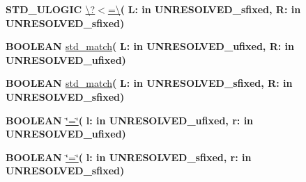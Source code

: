 \begin{DoxyCompactItemize}
\item 
{\bfseries {\bfseries \textcolor{comment}{S\+T\+D\+\_\+\+U\+L\+O\+G\+I\+C}\textcolor{vhdlchar}{ }}} \hyperlink{class__fixed__pkg_a276b77e776712ce9027d7858f46bf7b7}{\textbackslash{}?$<$=\textbackslash{}}{\bfseries  ( }{\bfseries \textcolor{vhdlchar}{L\+: }\textcolor{stringliteral}{in }\textcolor{vhdlchar}{U\+N\+R\+E\+S\+O\+L\+V\+E\+D\+\_\+sfixed}}{\bfseries  , \textcolor{vhdlchar}{R\+: }\textcolor{stringliteral}{in }\textcolor{vhdlchar}{U\+N\+R\+E\+S\+O\+L\+V\+E\+D\+\_\+sfixed}}{\bfseries  )} 
\item 
{\bfseries {\bfseries \textcolor{comment}{B\+O\+O\+L\+E\+A\+N}\textcolor{vhdlchar}{ }}} \hyperlink{class__fixed__pkg_ae375556995afe4742e27b94c60c7b976}{std\+\_\+match}{\bfseries  ( }{\bfseries \textcolor{vhdlchar}{L\+: }\textcolor{stringliteral}{in }\textcolor{vhdlchar}{U\+N\+R\+E\+S\+O\+L\+V\+E\+D\+\_\+ufixed}}{\bfseries  , \textcolor{vhdlchar}{R\+: }\textcolor{stringliteral}{in }\textcolor{vhdlchar}{U\+N\+R\+E\+S\+O\+L\+V\+E\+D\+\_\+ufixed}}{\bfseries  )} 
\item 
{\bfseries {\bfseries \textcolor{comment}{B\+O\+O\+L\+E\+A\+N}\textcolor{vhdlchar}{ }}} \hyperlink{class__fixed__pkg_ae375556995afe4742e27b94c60c7b976}{std\+\_\+match}{\bfseries  ( }{\bfseries \textcolor{vhdlchar}{L\+: }\textcolor{stringliteral}{in }\textcolor{vhdlchar}{U\+N\+R\+E\+S\+O\+L\+V\+E\+D\+\_\+sfixed}}{\bfseries  , \textcolor{vhdlchar}{R\+: }\textcolor{stringliteral}{in }\textcolor{vhdlchar}{U\+N\+R\+E\+S\+O\+L\+V\+E\+D\+\_\+sfixed}}{\bfseries  )} 
\item 
{\bfseries {\bfseries \textcolor{comment}{B\+O\+O\+L\+E\+A\+N}\textcolor{vhdlchar}{ }}} \hyperlink{class__fixed__pkg_a86c71a44ce23a245689eee9ff2db636a}{\char`\"{}=\char`\"{}}{\bfseries  ( }{\bfseries \textcolor{vhdlchar}{l\+: }\textcolor{stringliteral}{in }\textcolor{vhdlchar}{U\+N\+R\+E\+S\+O\+L\+V\+E\+D\+\_\+ufixed}}{\bfseries  , \textcolor{vhdlchar}{r\+: }\textcolor{stringliteral}{in }\textcolor{vhdlchar}{U\+N\+R\+E\+S\+O\+L\+V\+E\+D\+\_\+ufixed}}{\bfseries  )} 
\item 
{\bfseries {\bfseries \textcolor{comment}{B\+O\+O\+L\+E\+A\+N}\textcolor{vhdlchar}{ }}} \hyperlink{class__fixed__pkg_a86c71a44ce23a245689eee9ff2db636a}{\char`\"{}=\char`\"{}}{\bfseries  ( }{\bfseries \textcolor{vhdlchar}{l\+: }\textcolor{stringliteral}{in }\textcolor{vhdlchar}{U\+N\+R\+E\+S\+O\+L\+V\+E\+D\+\_\+sfixed}}{\bfseries  , \textcolor{vhdlchar}{r\+: }\textcolor{stringliteral}{in }\textcolor{vhdlchar}{U\+N\+R\+E\+S\+O\+L\+V\+E\+D\+\_\+sfixed}}{\bfseries  )} 
\item 

\end{DoxyCompactItemize}

